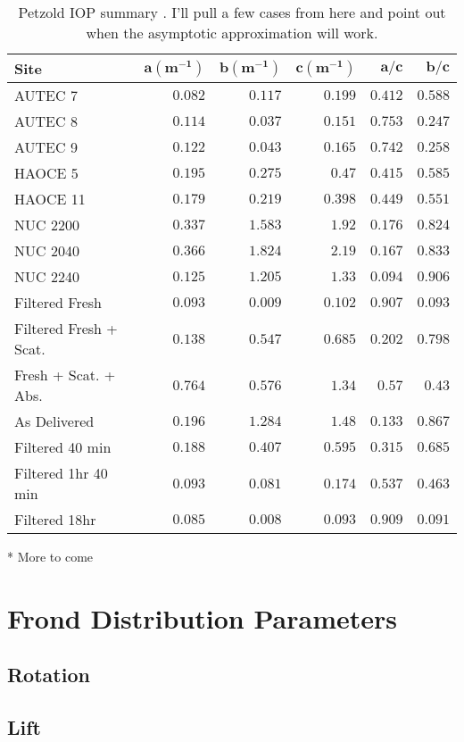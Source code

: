 \begin{table}
  \centering
  \begin{tabular}{lrrrrr}
    \toprule
    \textbf{Site} & $\bm{a (\mbox{m}^{-1})}$ & $\bm{b (\mbox{m}^{-1})}$ & $\bm{c(\mbox{m}^{-1} )}$ & $\bm{a/c}$ & $\bm{b/c}$ \\
    \midrule
    AUTEC 7 & $0.082$ & $0.117$ & $0.199$ & $0.412$ & $0.588$ \\
    AUTEC 8 & $0.114$ & $0.037$ & $0.151$ & $0.753$ & $0.247$ \\
    AUTEC 9 & $0.122$ & $0.043$ & $0.165$ & $0.742$ & $0.258$ \\
    HAOCE 5 & $0.195$ & $0.275$ & $0.47$ & $0.415$ & $0.585$ \\
    HAOCE 11 & $0.179$ & $0.219$ & $0.398$ & $0.449$ & $0.551$ \\
    NUC 2200 & $0.337$ & $1.583$ & $1.92$ & $0.176$ & $0.824$ \\
    NUC 2040 & $0.366$ & $1.824$ & $2.19$ & $0.167$ & $0.833$ \\
    NUC 2240 & $0.125$ & $1.205$ & $1.33$ & $0.094$ & $0.906$ \\
    Filtered Fresh & $0.093$ & $0.009$ & $0.102$ & $0.907$ & $0.093$ \\
    Filtered Fresh + Scat.  & $0.138$ & $0.547$ & $0.685$ & $0.202$ & $0.798$ \\
    Fresh + Scat. + Abs.& $0.764$ & $0.576$ & $1.34$ & $0.57$ & $0.43$ \\
    As Delivered & $0.196$ & $1.284$ & $1.48$ & $0.133$ & $0.867$ \\
    Filtered 40 min & $0.188$ & $0.407$ & $0.595$ & $0.315$ & $0.685$ \\
    Filtered 1hr 40 min & $0.093$ & $0.081$ & $0.174$ & $0.537$ & $0.463$ \\
    Filtered 18hr & $0.085$ & $0.008$ & $0.093$ & $0.909$ & $0.091$ \\
    \bottomrule
    \end{tabular}
  \caption{Petzold IOP summary \cite{petzold_volume_1972}. I'll pull a few cases from here and point out when the asymptotic approximation will work.}
\end{table}

* More to come

\section{Frond Distribution Parameters}
\subsection{Rotation}
\subsection{Lift}
